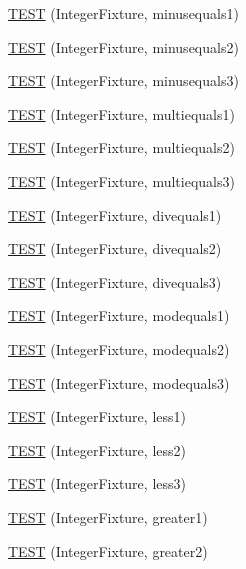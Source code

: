 \begin{DoxyCompactItemize}
\item 
\hyperlink{_test_integer_8c_09_09_aad7c7f1df8a17754b672fb0814028594}{T\-E\-S\-T} (Integer\-Fixture, minusequals1)
\item 
\hyperlink{_test_integer_8c_09_09_ad3f011001948053ea04e26bd5785eafb}{T\-E\-S\-T} (Integer\-Fixture, minusequals2)
\item 
\hyperlink{_test_integer_8c_09_09_a50852386400cfffa90dcea55467ee8b2}{T\-E\-S\-T} (Integer\-Fixture, minusequals3)
\item 
\hyperlink{_test_integer_8c_09_09_aa54624252ffe8c77a64c0dbb6ca68080}{T\-E\-S\-T} (Integer\-Fixture, multiequals1)
\item 
\hyperlink{_test_integer_8c_09_09_a71f9ac335e8a58bdeb7498522d446b2c}{T\-E\-S\-T} (Integer\-Fixture, multiequals2)
\item 
\hyperlink{_test_integer_8c_09_09_a836c7f2be578fc6a4daa560ec0d86513}{T\-E\-S\-T} (Integer\-Fixture, multiequals3)
\item 
\hyperlink{_test_integer_8c_09_09_a204d349fde86f2683108ddaf69e00ecd}{T\-E\-S\-T} (Integer\-Fixture, divequals1)
\item 
\hyperlink{_test_integer_8c_09_09_af31c2d37621cd8401661f5b37d36b817}{T\-E\-S\-T} (Integer\-Fixture, divequals2)
\item 
\hyperlink{_test_integer_8c_09_09_a8bc0163ab3a6e35f73156506d27e6707}{T\-E\-S\-T} (Integer\-Fixture, divequals3)
\item 
\hyperlink{_test_integer_8c_09_09_a44ae639d9700aca26a50ee4df331277a}{T\-E\-S\-T} (Integer\-Fixture, modequals1)
\item 
\hyperlink{_test_integer_8c_09_09_ab36c12feecec85d1498f9c05155a6a3d}{T\-E\-S\-T} (Integer\-Fixture, modequals2)
\item 
\hyperlink{_test_integer_8c_09_09_a99d5b0b5fff47912469223e6d00fa272}{T\-E\-S\-T} (Integer\-Fixture, modequals3)
\item 
\hyperlink{_test_integer_8c_09_09_a7eab988ae79730f25939e28590af6fe9}{T\-E\-S\-T} (Integer\-Fixture, less1)
\item 
\hyperlink{_test_integer_8c_09_09_a7b6b4b595f6c5f3e5f7716dc68b85860}{T\-E\-S\-T} (Integer\-Fixture, less2)
\item 
\hyperlink{_test_integer_8c_09_09_a44c4b5f6952d68d45f29fd40b16aa826}{T\-E\-S\-T} (Integer\-Fixture, less3)
\item 
\hyperlink{_test_integer_8c_09_09_aba5303513d3c169fc11d047aae16656b}{T\-E\-S\-T} (Integer\-Fixture, greater1)
\item 
\hyperlink{_test_integer_8c_09_09_a897c0eb0c03a330f83d9ec2a6fdcd947}{T\-E\-S\-T} (Integer\-Fixture, greater2)

\end{DoxyCompactItemize}
